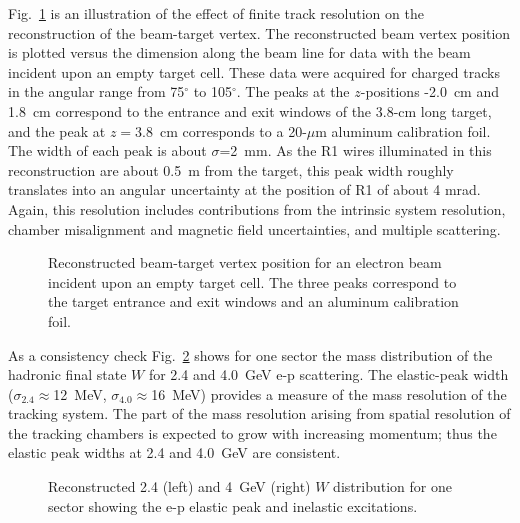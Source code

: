 Fig.~\ref{zvertex} is an illustration of the effect of finite track resolution
on the reconstruction of the beam-target vertex.
The reconstructed beam
vertex position is plotted versus the dimension along the beam
line for data with the beam incident upon an empty 
target cell.  These data were acquired for charged tracks in the angular range from 
75$^{\circ}$ to 105$^{\circ}$.  The peaks at the $z$-positions -2.0~cm and 1.8~cm 
correspond to the entrance and exit windows of the 3.8-cm long target, and the peak 
at $z=3.8$~cm corresponds to a 20-$\mu$m aluminum calibration foil.  The width of 
each peak is about $\sigma$=2~mm.  As the R1 wires illuminated in this reconstruction 
are about 0.5~m from the target, this peak width roughly translates into an angular 
uncertainty at the position of R1 of about 4 mrad.  Again, this resolution includes
contributions from the intrinsic system resolution, chamber misalignment and magnetic
field uncertainties, and multiple scattering.
  
\begin{figure}[htpb]
\vspace{5cm} 
\caption{\small{Reconstructed beam-target vertex position for an electron beam
incident upon an empty target cell.  The three peaks correspond to the
target entrance and exit windows and an aluminum calibration foil.}}
\label{zvertex}
\end{figure}


As a consistency check Fig.~\ref{elastic} shows for one sector the mass 
distribution of the hadronic final state $W$ for 2.4 and 4.0~GeV e-p scattering.
The elastic-peak width ($\sigma_{2.4} \approx$12~MeV, $\sigma_{4.0} 
\approx$16~MeV) provides a measure of the mass resolution of the tracking system.
The part of the mass resolution arising from spatial resolution of the tracking
chambers is expected to grow with increasing momentum; thus the
elastic peak widths at 2.4 and 4.0~GeV are consistent.

\begin{figure}[htpb]
\vspace{5.5cm} 
\caption{\small{Reconstructed 2.4 (left) and 4~GeV (right) $W$ distribution for 
one sector showing the e-p elastic peak and inelastic excitations.}}
\label{elastic}
\end{figure}


